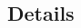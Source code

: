 \documentclass[10pt,a4paper]{article}
\begin{document}
\pagestyle{empty} 


\newpage

\setcounter{page}{1}
\pagestyle{plain}

\begin{multicols}{2}

\tableofcontents



\section{Details}
  
  
  

\end{multicols}
\printbibliography
\end{document}
